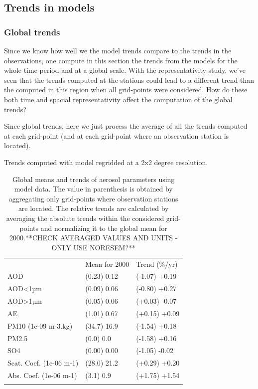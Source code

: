 \documentclass[journal abbreviation, manuscript]{copernicus}
\begin{document}
\subsection{Trends in models}

\subsubsection{Global trends}

Since we know how well we the model trends compare to the trends in the observations, one compute in this section the trends from the models for the whole time period and at a global scale. With the representativity study, we've seen that the trends computed at the stations could lead to a different trend than the computed in this region when all grid-points were considered. How do these both time and spacial representativity affect the computation of the global trends?

Since global trends, here we just process the average of all the trends computed at each grid-point (and at each grid-point where an observation station is located).

Trends computed with model regridded at a 2x2 degree resolution.

\begin{table}
 \begin{tabular}{lll}
  \tophline
                          & Mean for 2000 & Trend (\%/yr) \\
  \middlehline
  AOD                     & (0.23) 0.12   & (-1.07) +0.19 \\
  AOD<1µm                 & (0.09) 0.06   & (-0.80) +0.27 \\
  AOD>1µm                 & (0.05) 0.06   & (+0.03) -0.07 \\
  AE                      & (1.01) 0.67   & (+0.15) +0.09 \\
  PM10 (1e-09 m-3.kg)     & (34.7) 16.9   & (-1.54) +0.18 \\
  PM2.5                   & (0.0) 0.0     & (-1.58) +0.16 \\
  SO4                     & (0.00) 0.00   & (-1.05) -0.02 \\
  Scat. Coef. (1e-06 m-1) & (28.0) 21.2   & (+0.29) +0.20 \\
  Abs. Coef. (1e-06 m-1)  & (3.1) 0.9     & (+1.75) +1.54 \\
  \bottomhline
 \end{tabular}
 \caption{Global means and trends of aerosol parameters using model data. The value in parenthesis is obtained by aggregating only grid-points where observation stations are located. The relative trends are calculated by averaging the absolute trends within the considered grid-points and normalizing it to the global mean for 2000.**CHECK AVERAGED VALUES AND UNITS - ONLY USE NORESEM?**}
 \label{mod_tab_trends}
\end{table}
\end{document}
